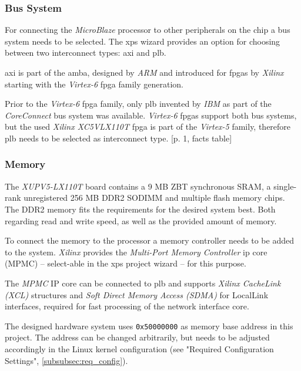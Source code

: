 \subsubsection{Bus System}

For connecting the \textit{MicroBlaze} processor to other peripherals on the chip a bus system needs to be selected. The \gls{xps} wizard provides an option for choosing between two interconnect types: \gls{axi} and \gls{plb}.

\gls{axi} is part of the \gls{amba}, designed by \textit{ARM} and introduced for \gls{fpga}s by \textit{Xilinx} starting with the \textit{Virtex-6} \gls{fpga} family generation.

Prior to the \textit{Virtex-6} \gls{fpga} family, only \gls{plb} invented by \textit{IBM} as part of the \textit{CoreConnect} bus system was available. \textit{Virtex-6} \gls{fpga}s support both bus systems, but the used \textit{Xilinx XC5VLX110T} \gls{fpga} is part of the \textit{Virtex-5} family, therefore \gls{plb} needs to be selected as interconnect type. \cite{axi_interconnect}[p. 1, facts table]

\subsubsection{Memory}

The \textit{XUPV5-LX110T} board contains a 9 MB ZBT synchronous SRAM, a single-rank unregistered 256 MB DDR2 SODIMM and multiple flash memory chips. The DDR2 memory fits the requirements for the desired system best. Both regarding read and write speed, as well as the provided amount of memory.

To connect the memory to the processor a memory controller needs to be added to the system.  \textit{Xilinx} provides the \textit{Multi-Port Memory Controller} \gls{ip} core (MPMC) -- select-able in the \gls{xps} project wizard -- for this purpose.

The \textit{MPMC} IP core can be connected to \gls{plb} and supports \textit{Xilinx CacheLink (XCL)} structures and \textit{Soft Direct Memory Access (SDMA)} for LocalLink interfaces, required for fast processing of the network interface core. \cite{mpmc}

The designed hardware system uses \texttt{0x50000000} as memory base address in this project. The address can be changed arbitrarily, but needs to be adjusted accordingly in the Linux kernel configuration (see "Required Configuration Settings",  \ref{subsubsec:req_config}).

